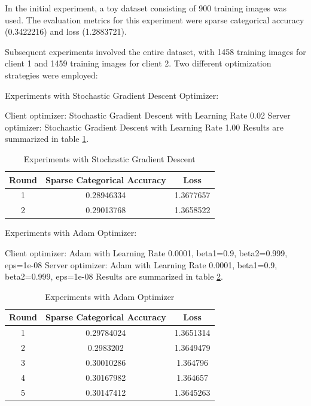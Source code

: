 \documentclass[runningheads,a4paper,11pt]{report}
\begin{document}
In the initial experiment, a toy dataset consisting of 900 training images was used. The evaluation metrics for this experiment were sparse categorical accuracy (0.3422216) and loss (1.2883721).

Subsequent experiments involved the entire dataset, with 1458 training images for client 1 and 1459 training images for client 2. Two different optimization strategies were employed:

Experiments with Stochastic Gradient Descent Optimizer:
\begin{itemize}
Client optimizer: Stochastic Gradient Descent with Learning Rate 0.02
Server optimizer: Stochastic Gradient Descent with Learning Rate 1.00
Results are summarized in table \ref{tab:results_sgd}.
\end{itemize}

\begin{table}[htb]
\centering
\begin{tabular}{|c|c|c|}
\hline
\textbf{Round} & \textbf{Sparse Categorical Accuracy} & \textbf{Loss} \\
\hline
1 & 0.28946334 & 1.3677657 \\
\hline
2 & 0.29013768 & 1.3658522 \\
\hline
\end{tabular}
\caption{Experiments with Stochastic Gradient Descent}
\label{tab:results_sgd}
\end{table}


Experiments with Adam Optimizer:
\begin{itemize}
Client optimizer: Adam with Learning Rate 0.0001, beta1=0.9, beta2=0.999, eps=1e-08
Server optimizer: Adam with Learning Rate 0.0001, beta1=0.9, beta2=0.999, eps=1e-08
Results are summarized in table \ref{tab:results_adam}.
\end{itemize}


\begin{table}[htb]
\centering
\begin{tabular}{|c|c|c|}
\hline
\textbf{Round} & \textbf{Sparse Categorical Accuracy} & \textbf{Loss} \\
\hline
1 & 0.29784024 & 1.3651314 \\
\hline
2 & 0.2983202 & 1.3649479 \\
\hline
3 & 0.30010286 & 1.364796 \\
\hline
4 & 0.30167982 & 1.364657 \\
\hline
5 & 0.30147412 & 1.3645263 \\
\hline
\end{tabular}
\caption{Experiments with Adam Optimizer}
\label{tab:results_adam}
\end{table}
\end{document}
